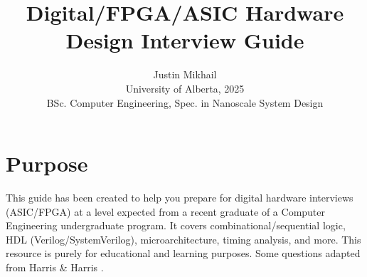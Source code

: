 \documentclass[11pt]{article}
\begin{document}
\title{Digital/FPGA/ASIC Hardware Design Interview Guide}
\author{Justin Mikhail\\University of Alberta, 2025\\BSc. Computer Engineering, Spec. in Nanoscale System Design}
\date{}
\maketitle

\section*{Purpose}
This guide has been created to help you prepare for digital hardware interviews
(ASIC/FPGA) at a level expected from a recent graduate of a Computer
Engineering undergraduate program. It covers combinational/sequential logic,
HDL (Verilog/SystemVerilog), microarchitecture, timing analysis, and more. This
resource is purely for educational and learning purposes. Some questions
adapted from Harris \& Harris \cite{Harris2021}.

\end{document}
